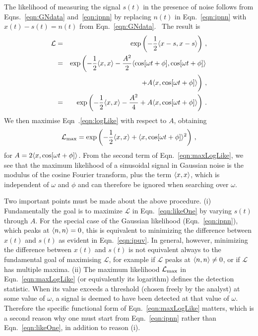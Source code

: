 \documentclass[paper-main.tex]{subfiles}
\begin{document}
The likelihood of measuring the signal $s(t)$ in the presence of noise follows from Eqns.~\ref{eqn:GNdata} and~\ref{eqn:ipnn} by replacing $n(t)$ in Eqn.~\ref{eqn:ipnn} with $x(t) - s(t) = n(t)$ from Eqn.~\ref{eqn:GNdata}.~\cite{JKS:1998,Jaynes:2003}
The result is
\begin{eqnarray}
\mathcal{L} &=& \exp\left( -\frac{1}{2}\langle x-s,x-s \rangle \right) \label{eqn:likeOne}\,, \\ 
            &=& \exp\left( -\frac{1}{2}\langle x,x \rangle - \frac{A^2}{2} \langle \cos[\omega t + \phi],\cos[\omega t + \phi] \rangle \right. \nonumber\\
                 &&\hspace{3em} \left. +  A \langle x,\cos[\omega t + \phi] \rangle \vphantom{\frac12}\right) \,,\\ 
                 &=& \exp \left( -\frac{1}{2}\langle x,x \rangle - \frac{A^2}{4} + A \langle x,\cos[\omega t + \phi] \rangle \right)\,.\label{eqn:logLike}
\end{eqnarray}
We then maximise Eqn~.\ref{eqn:logLike} with respect to $A$, obtaining 
\begin{eqnarray}
\label{eqn:maxLogLike}
\mathcal{L}_\mathrm{max} = \exp \left( - \frac{1}{2} \langle x,x \rangle + \langle x,\cos[\omega t + \phi] \rangle^2 \right)\,,
\end{eqnarray}
for $A = 2\langle x,\cos[\omega t + \phi] \rangle$.
From the second term of Eqn.~\ref{eqn:maxLogLike}, we see that the maximum likelihood of a sinusoidal signal in Gaussian noise is the modulus of the cosine Fourier transform, plus the term $\langle x,x \rangle$, which is independent of $\omega$ and $\phi$ and can therefore be ignored when searching over $\omega$.

Two important points must be made about the above procedure. 
(i) Fundamentally the goal is to maximize $\mathcal{L}$ in Eqn.~\ref{eqn:likeOne} by varying $s(t)$ through $A$.
For the special case of the Gaussian likelihood (Eqn.~\ref{eqn:ipnn}), which peaks at $\langle n,n \rangle= 0$, this is equivalent to minimizing the difference between $x(t)$ and $s(t)$ as evident in Eqn.~\ref{eqn:ipuv}.
In general, however, minimizing the difference between $x(t)$ and $s(t)$ is not equivalent always to the fundamental goal of maximising $\mathcal{L}$, for example if $\mathcal{L}$ peaks at $\langle n,n \rangle \neq 0$, or if $\mathcal{L}$ has multiple maxima.
(ii) The maximum likelihood $\mathcal{L}_{\rm max}$ in Eqn.~\ref{eqn:maxLogLike} (or equivalently its logarithm) defines the detection statistic. 
When its value exceeds a threshold (chosen freely by the analyst) at some value of $\omega$, a signal is deemed to have been detected at that value of $\omega$.
Therefore the specific functional form of Eqn.~\ref{eqn:maxLogLike} matters, which is a second reason why one must start from Eqn.~\ref{eqn:ipnn} rather than Eqn.~\ref{eqn:likeOne}, in addition to reason (i).
\end{document}

